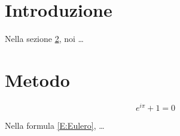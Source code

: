 \documentclass{article}
\begin{document}
\section{Introduzione}
\label{S:Introduzione}
Nella sezione \ref{S:Metodo}, noi \ldots

\section{Metodo}
\label{S:Metodo}

\begin{equation}
\label{E:Eulero}
e^{i\pi} + 1 = 0
\end{equation}

Nella formula \eqref{E:Eulero}, \ldots
\end{document}
